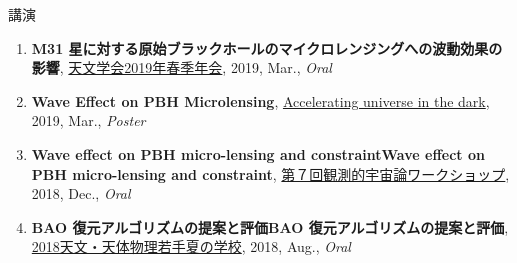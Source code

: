 \begin{rSection}{講演}
\begin{enumerate}[itemsep=0pt, parsep=0pt, topsep=0pt, partopsep=0pt]
\item \textbf{M31 星に対する原始ブラックホールのマイクロレンジングへの波動効果の影響}, \href{https://www.asj.or.jp/nenkai/archive/2019a/pdf/U14a.pdf}{天文学会2019年春季年会}, 2019, Mar., \textit{Oral}
\item \textbf{Wave Effect on PBH Microlensing}, \href{http://www2.yukawa.kyoto-u.ac.jp/~aud2019/index.php}{Accelerating universe in the dark}, 2019, Mar., \textit{Poster}
\item \textbf{Wave effect on PBH micro-lensing and constraintWave effect on PBH micro-lensing and constraint}, \href{http://web.cc.yamaguchi-u.ac.jp/~rsaito/obscosmo2018/}{第７回観測的宇宙論ワークショップ}, 2018, Dec., \textit{Oral}
\item \textbf{BAO 復元アルゴリズムの提案と評価BAO 復元アルゴリズムの提案と評価}, \href{http://www.astro-wakate.org/ss2018/web/link.html}{2018天文・天体物理若手夏の学校}, 2018, Aug., \textit{Oral}
\end{enumerate}\end{rSection}
